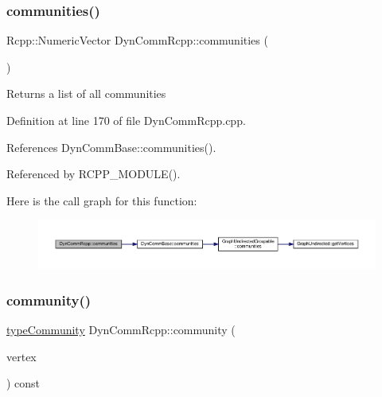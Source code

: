 \subsubsection{\texorpdfstring{communities()}{communities()}}
{\footnotesize\ttfamily Rcpp\+::\+Numeric\+Vector Dyn\+Comm\+Rcpp\+::communities (\begin{DoxyParamCaption}{ }\end{DoxyParamCaption})\hspace{0.3cm}{\ttfamily [inline]}}

\begin{DoxyReturn}{Returns}
a list of all communities 
\end{DoxyReturn}


Definition at line 170 of file Dyn\+Comm\+Rcpp.\+cpp.



References Dyn\+Comm\+Base\+::communities().



Referenced by R\+C\+P\+P\+\_\+\+M\+O\+D\+U\+L\+E().

Here is the call graph for this function\+:\nopagebreak
\begin{figure}[H]
\begin{center}
\leavevmode
\includegraphics[width=350pt]{classDynCommRcpp_ade6d5c2ebbb13f2efb3988d0d0ac2c1e_cgraph}
\end{center}
\end{figure}
\mbox{\label{classDynCommRcpp_ac3c8c1759d2ab106b757557e09834ec5}} 
\subsubsection{\texorpdfstring{community()}{community()}}
{\footnotesize\ttfamily \hyperlink{graphUndirectedGroupable_8h_a914da95c9ea7f14f4b7f875c36818556}{type\+Community} Dyn\+Comm\+Rcpp\+::community (\begin{DoxyParamCaption}\item[{\hyperlink{edge_8h_a5fbd20c46956d479cb10afc9855223f6}{type\+Vertex}}]{vertex }\end{DoxyParamCaption}) const\hspace{0.3cm}{\ttfamily [inline]}}



